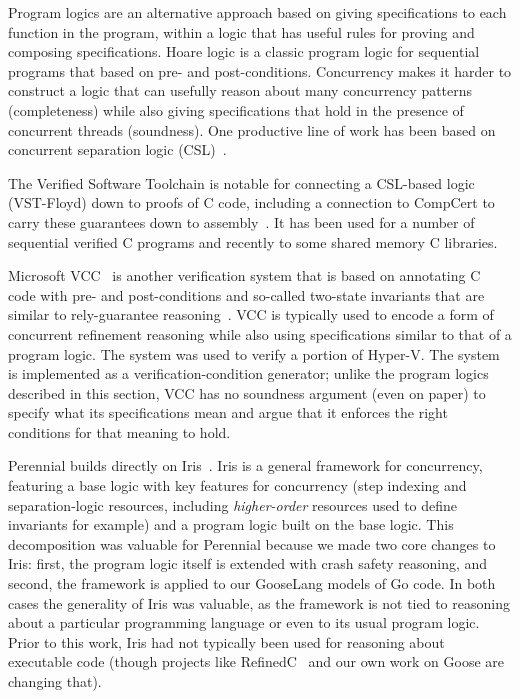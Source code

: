 Program logics are an alternative approach based on giving specifications to
each function in the program, within a logic that has useful rules for proving
and composing specifications. Hoare logic is a classic program
logic for sequential programs that based on pre- and post-conditions.
Concurrency makes it harder to construct a logic that can usefully reason about
many concurrency patterns (completeness) while also giving specifications that
hold in the presence of concurrent threads (soundness). One productive line of
work has been based on concurrent separation logic (CSL)~\cite{brookes:csl}.

The Verified Software Toolchain is notable for connecting a CSL-based logic
(VST-Floyd) down to proofs of C code, including a connection to CompCert to
carry these guarantees down to assembly~\cite{cao:vst-floyd}. It has been used
for a number of sequential verified C programs and recently to some shared
memory C libraries.

Microsoft VCC~\cite{cohen:vcc,cohen:vcc-local} is another verification system
that is based on annotating C code with pre- and post-conditions and so-called
two-state invariants that are similar to rely-guarantee
reasoning~\cite{jones:rg,feng:lrg}. VCC is typically used to encode a form
of concurrent refinement reasoning while also using specifications similar to
that of a program logic. The system was used to verify a portion of Hyper-V. The
system is implemented as a verification-condition generator; unlike the program
logics described in this section, VCC has no soundness argument (even on paper)
to specify what its specifications mean and argue that it enforces the right
conditions for that meaning to hold.

Perennial builds directly on Iris~\cite{jung:iris-jfp}. Iris is a general
framework for concurrency, featuring a base logic with key features for
concurrency (step indexing and separation-logic resources, including
\emph{higher-order} resources used to define invariants for example) and a
program logic built on the base logic. This decomposition was valuable for
Perennial because we made two core changes to Iris: first, the program logic
itself is extended with crash safety reasoning, and second, the framework is
applied to our GooseLang models of Go code. In both cases the generality of Iris
was valuable, as the framework is not tied to reasoning about a particular
programming language or even to its usual program logic. Prior to this work,
Iris had not typically been used for reasoning about executable code (though
projects like RefinedC~\cite{sammler:refinedc} and our own work on Goose are
changing that).

